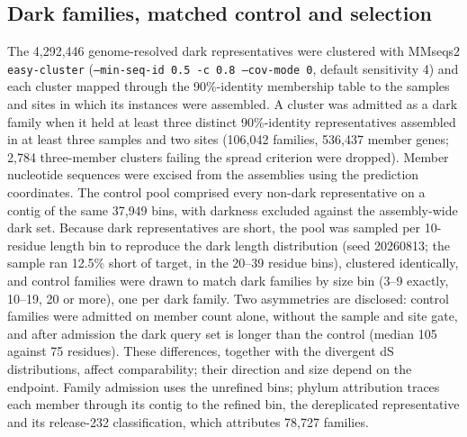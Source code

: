 \subsection*{Dark families, matched control and selection}
The 4{,}292{,}446 genome-resolved dark representatives were clustered with MMseqs2
\texttt{easy-cluster} (\texttt{--min-seq-id 0.5 -c 0.8 --cov-mode 0}, default sensitivity 4) and each
cluster mapped through the 90\%-identity membership table to the samples and sites in which its
instances were assembled. A cluster was admitted as a dark family when it held at least three
distinct 90\%-identity representatives assembled in at least three samples and two sites (106{,}042
families, 536{,}437 member genes; 2{,}784 three-member clusters failing the spread criterion were dropped). Member nucleotide sequences were excised from the assemblies using the
prediction coordinates. The control pool comprised every non-dark representative on a contig of the
same 37{,}949 bins, with darkness excluded against the assembly-wide dark set. Because dark
representatives are short, the pool was sampled per 10-residue length bin to reproduce the dark
length distribution (seed 20260813; the sample ran 12.5\% short of target, in the 20--39 residue
bins), clustered identically, and control families were drawn to match dark families by size bin
(3--9 exactly, 10--19, 20 or more), one per dark family. Two asymmetries are disclosed: control
families were admitted on member count alone, without the sample and site gate, and after admission
the dark query set is longer than the control (median 105 against 75 residues). These differences, together with the divergent dS distributions, affect comparability; their
direction and size depend on the endpoint. Family admission uses the unrefined bins; phylum attribution traces each member
through its contig to the refined bin, the dereplicated representative and its release-232
classification, which attributes 78{,}727 families.

